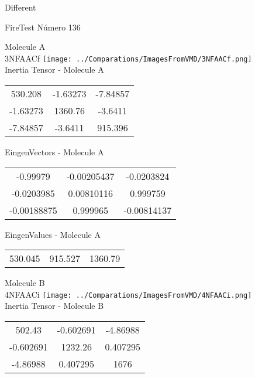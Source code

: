 \begin{center}
\vtab
\vtab
\textcolor{NavyBlue}{\Large Different}
\end{center}

 \newpage

\vtab[-2cm]
\begin{center}
{\large FireTest \tab Número 136}
\end{center}
\begin{multicols}{2}
\begin{center}

Molecule A \\ 
3NFAACf
\texttt{[image: ../Comparations/ImagesFromVMD/3NFAACf.png]}
\\
Inertia Tensor - Molecule A \\
\vtab

\begin{tabular}{|c c c|}
530.208	 & 	-1.63273	 & 	-7.84857	 \\
-1.63273	 & 	1360.76	 & 	-3.6411	 \\
-7.84857	 & 	-3.6411	 & 	915.396
\end{tabular}

\vtab
 EingenVectors - Molecule A     \\
\vtab
\begin{tabular}{|c c c|}
-0.99979	 & 	-0.00205437	 & 	-0.0203824	 \\
-0.0203985	 & 	0.00810116	 & 	0.999759	 \\
-0.00188875	 & 	0.999965	 & 	-0.00814137
\end{tabular}

\vtab
 EingenValues - Molecule A     \\
\vtab
\begin{tabular}{|c c c|}
530.045	 & 	915.527	 & 	1360.79	 \\
\end{tabular}
\columnbreak

Molecule B \\ 
4NFAACi
\texttt{[image: ../Comparations/ImagesFromVMD/4NFAACi.png]}
\\
Inertia Tensor - Molecule B \\
\vtab

\begin{tabular}{|c c c|}
502.43	 & 	-0.602691	 & 	-4.86988	 \\
-0.602691	 & 	1232.26	 & 	0.407295	 \\
-4.86988	 & 	0.407295	 & 	1676
\end{tabular}


\end{center}
\end{multicols}
